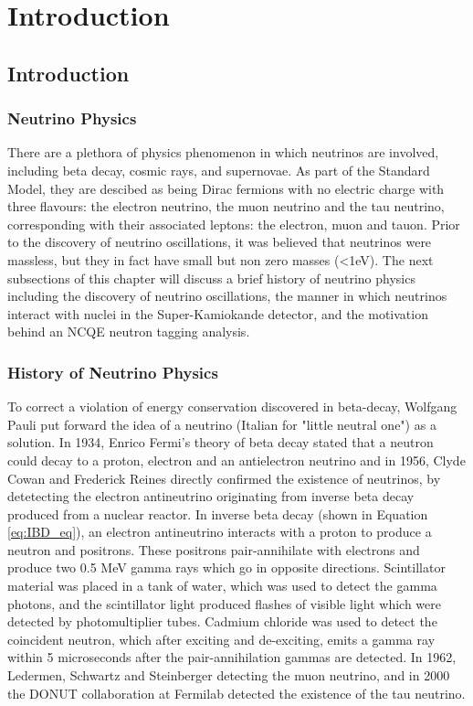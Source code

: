 \chapter{Introduction}
\label{chp:intro}

\section{Introduction}

\subsection{Neutrino Physics}

There are a plethora of physics phenomenon in which neutrinos are involved, including beta decay, cosmic rays, and supernovae. As part of the Standard Model, they are descibed as being Dirac fermions with no electric charge with three flavours: the electron neutrino, the muon neutrino and the tau neutrino, corresponding with their associated leptons: the electron, muon and tauon. Prior to the discovery of neutrino oscillations, it was believed that neutrinos were massless, but they in fact have small but non zero masses (<1eV). The next subsections of this chapter will discuss a brief history of neutrino physics including the discovery of neutrino oscillations, the manner in which neutrinos interact with nuclei in the Super-Kamiokande detector, and the motivation behind an NCQE neutron tagging analysis.

\subsection{History of Neutrino Physics}

To correct a violation of energy conservation discovered in beta-decay, Wolfgang Pauli put forward the idea of a neutrino (Italian for "little neutral one") as a solution. In 1934, Enrico Fermi's theory of beta decay stated that a neutron could decay to a proton, electron and an antielectron neutrino and in 1956, Clyde Cowan and Frederick Reines directly confirmed the existence of neutrinos, by detetecting the electron antineutrino originating from inverse beta decay produced from a nuclear reactor. In inverse beta decay (shown in Equation \ref{eq:IBD_eq}), an electron antineutrino interacts with a proton to produce a neutron and positrons. These positrons pair-annihilate with electrons and produce two 0.5 MeV gamma rays which go in opposite directions. Scintillator material was placed in a tank of water, which was used to detect the gamma photons, and the scintillator light produced flashes of visible light which were detected by photomultiplier tubes. Cadmium chloride was used to detect the coincident neutron, which after exciting and de-exciting, emits a gamma ray within 5 microseconds after the pair-annihilation gammas are detected. In 1962, Ledermen, Schwartz and Steinberger detecting the muon neutrino, and in 2000 the DONUT collaboration at Fermilab detected the existence of the tau neutrino. 


